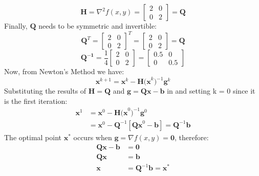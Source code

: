\documentclass{article}
\begin{document}
\begin{equation*}
    \mathbf{H} = \nabla^{2}f(x,y) = \begin{bmatrix} 2 & 0 \\ 0 & 2 \end{bmatrix} = \mathbf{Q}
\end{equation*}
\noindent Finally, $\mathbf{Q}$ needs to be symmetric and invertible:
\begin{equation*}
    \mathbf{Q}^{T} = \begin{bmatrix} 2 & 0 \\ 0 & 2 \end{bmatrix}^{T} = \begin{bmatrix} 2 & 0 \\ 0 & 2 \end{bmatrix} = \mathbf{Q}
\end{equation*}
\begin{equation*}
    \mathbf{Q^{-1}} = \frac{1}{4}\begin{bmatrix} 2 & 0 \\ 0 & 2 \end{bmatrix} = \begin{bmatrix} 0.5 & 0 \\ 0 & 0.5 \end{bmatrix}
\end{equation*}
Now, from Newton's Method we have:
\begin{equation*}
    \mathbf{x}^{k+1} = \mathbf{x}^{k} - \mathbf{H(x}^{k})^{-1}\mathbf{g}^{k}
\end{equation*}
Substituting the results of $\mathbf{H} = \mathbf{Q}$ and $\mathbf{g} = \mathbf{Qx} - \mathbf{b}$ in and setting k = 0 since it is the first iteration:
\begin{align*}
    \mathbf{x}^{1} &= \mathbf{x}^{0} - \mathbf{H(x}^{0})^{-1}\mathbf{g}^{0}\\
    &= \mathbf{x}^{0} - \mathbf{Q}^{-1}[\mathbf{Qx}^{0} - \mathbf{b}] = \mathbf{Q}^{-1}\mathbf{b}
\end{align*}
The optimal point $\mathbf{x}^{*}$ occurs when $\mathbf{g} = \nabla f(x,y) = \mathbf{0}$, therefore:
\begin{align*}
    \mathbf{Qx} - \mathbf{b} &= \mathbf{0}\\
    \mathbf{Qx} &= \mathbf{b}\\
    \mathbf{x} &= \mathbf{Q}^{-1}\mathbf{b} = \mathbf{x}^{*}
\end{align*}
\end{document}
